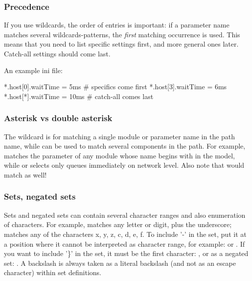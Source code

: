 \subsubsection{Precedence}

If you use wildcards, the order of entries is important: if a parameter
name matches several wildcards-patterns, the \textit{first} matching occurrence
is used. This means that you need to list specific settings first, and
more general ones later. Catch-all settings should come last.

An example ini file:

\begin{inifile}
[General]
*.host[0].waitTime = 5ms   # specifics come first
*.host[3].waitTime = 6ms
*.host[*].waitTime = 10ms  # catch-all comes last
\end{inifile}


\subsubsection{Asterisk vs double asterisk}

The \ttt{*} wildcard is for matching a single module or parameter name in the
path name, while \ttt{**} can be used to match several components in the path.
For example,  matches the  parameter of any module
whose name begins with  in the model, while 
or  selects only queues immediately on network level.
Also note that  would match 
as well!

\subsubsection{Sets, negated sets}

Sets and negated sets can contain several character ranges and also
enumeration of characters. For example,  matches any letter
or digit, plus the underscore;  matches any of the characters
x, y, z, c, d, e, f.
To include '-' in the set, put it at a position where it cannot be
interpreted as character range, for example:  or .
If you want to include '\}' in the set, it must be the first
character: , or as a negated set: .
A backslash is always taken as a literal backslash (and not as an escape character)
within set definitions.


